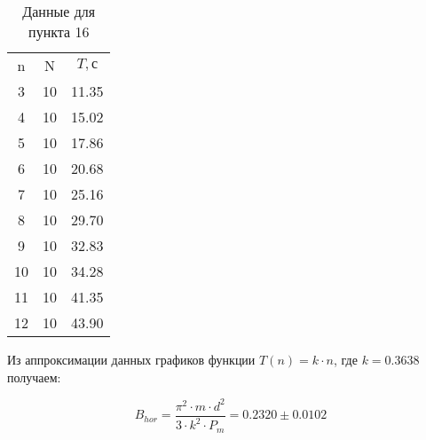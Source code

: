 \documentclass[a4paper]{article}
\begin{document}
    \begin{table}[h]
    \centering
        \begin{tabular}{|c|c|c|}
        \cline{1-3}
        n & N & $T, \textit{с}$\\ \cline{1-3}
        3 &  10 & 11.35\\ \cline{1-3}
        4 &  10 & 15.02\\ \cline{1-3}
        5 &  10 & 17.86\\ \cline{1-3}
        6 &  10 & 20.68\\ \cline{1-3}
        7 &  10 & 25.16\\ \cline{1-3}
        8 &  10 & 29.70\\ \cline{1-3}
        9 &  10 & 32.83\\ \cline{1-3}
        10 &  10 & 34.28\\ \cline{1-3}
        11 &  10 & 41.35\\ \cline{1-3}
        12 &  10 & 43.90 \\ \cline{1-3}
        \end{tabular}
        \caption{Данные для пункта 16}
        \label{tab:my_label}
    \end{table}


Из аппроксимации данных графиков функции $T(n) = k \cdot n$, где $k = 0.3638$ получаем:
\begin{center}
    \begin{equation}
         B_{hor} = \frac{\pi ^ 2 \cdot m \cdot d^2}{3\cdot k^2 \cdot P_m} = 0.2320 \pm 0.0102
    \end{equation}    
\end{center}
\end{document}
